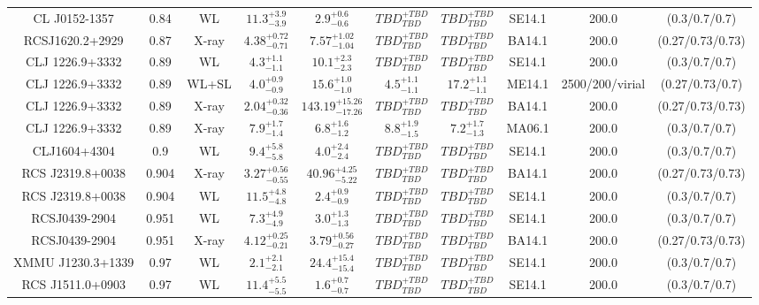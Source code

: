 \begin{table}
\begin{tabular}{cccccccccc}
CL J0152-1357 & 0.84 & WL & ${11.3}^{+3.9}_{-3.9}$ & ${2.9}^{+0.6}_{-0.6}$ & ${TBD}^{+TBD}_{TBD}$ & ${TBD}^{+TBD}_{TBD}$ & SE14.1 & 200.0 & (0.3/0.7/0.7) \\
RCSJ1620.2+2929 & 0.87 & X-ray & ${4.38}^{+0.72}_{-0.71}$ & ${7.57}^{+1.02}_{-1.04}$ & ${TBD}^{+TBD}_{TBD}$ & ${TBD}^{+TBD}_{TBD}$ & BA14.1 & 200.0 & (0.27/0.73/0.73) \\
CLJ 1226.9+3332 & 0.89 & WL & ${4.3}^{+1.1}_{-1.1}$ & ${10.1}^{+2.3}_{-2.3}$ & ${TBD}^{+TBD}_{TBD}$ & ${TBD}^{+TBD}_{TBD}$ & SE14.1 & 200.0 & (0.3/0.7/0.7) \\
CLJ 1226.9+3332 & 0.89 & WL+SL & ${4.0}^{+0.9}_{-0.9}$ & ${15.6}^{+1.0}_{-1.0}$ & ${4.5}^{+1.1}_{-1.1}$ & ${17.2}^{+1.1}_{-1.1}$ & ME14.1 & 2500/200/virial & (0.27/0.73/0.7) \\
CLJ 1226.9+3332 & 0.89 & X-ray & ${2.04}^{+0.32}_{-0.36}$ & ${143.19}^{+15.26}_{-17.26}$ & ${TBD}^{+TBD}_{TBD}$ & ${TBD}^{+TBD}_{TBD}$ & BA14.1 & 200.0 & (0.27/0.73/0.73) \\
CLJ 1226.9+3332 & 0.89 & X-ray & ${7.9}^{+1.7}_{-1.4}$ & ${6.8}^{+1.6}_{-1.2}$ & ${8.8}^{+1.9}_{-1.5}$ & ${7.2}^{+1.7}_{-1.3}$ & MA06.1 & 200.0 & (0.3/0.7/0.7) \\
CLJ1604+4304 & 0.9 & WL & ${9.4}^{+5.8}_{-5.8}$ & ${4.0}^{+2.4}_{-2.4}$ & ${TBD}^{+TBD}_{TBD}$ & ${TBD}^{+TBD}_{TBD}$ & SE14.1 & 200.0 & (0.3/0.7/0.7) \\
RCS J2319.8+0038 & 0.904 & X-ray & ${3.27}^{+0.56}_{-0.55}$ & ${40.96}^{+4.25}_{-5.22}$ & ${TBD}^{+TBD}_{TBD}$ & ${TBD}^{+TBD}_{TBD}$ & BA14.1 & 200.0 & (0.27/0.73/0.73) \\
RCS J2319.8+0038 & 0.904 & WL & ${11.5}^{+4.8}_{-4.8}$ & ${2.4}^{+0.9}_{-0.9}$ & ${TBD}^{+TBD}_{TBD}$ & ${TBD}^{+TBD}_{TBD}$ & SE14.1 & 200.0 & (0.3/0.7/0.7) \\
RCSJ0439-2904 & 0.951 & WL & ${7.3}^{+4.9}_{-4.9}$ & ${3.0}^{+1.3}_{-1.3}$ & ${TBD}^{+TBD}_{TBD}$ & ${TBD}^{+TBD}_{TBD}$ & SE14.1 & 200.0 & (0.3/0.7/0.7) \\
RCSJ0439-2904 & 0.951 & X-ray & ${4.12}^{+0.25}_{-0.21}$ & ${3.79}^{+0.56}_{-0.27}$ & ${TBD}^{+TBD}_{TBD}$ & ${TBD}^{+TBD}_{TBD}$ & BA14.1 & 200.0 & (0.27/0.73/0.73) \\
XMMU J1230.3+1339 & 0.97 & WL & ${2.1}^{+2.1}_{-2.1}$ & ${24.4}^{+15.4}_{-15.4}$ & ${TBD}^{+TBD}_{TBD}$ & ${TBD}^{+TBD}_{TBD}$ & SE14.1 & 200.0 & (0.3/0.7/0.7) \\
RCS J1511.0+0903 & 0.97 & WL & ${11.4}^{+5.5}_{-5.5}$ & ${1.6}^{+0.7}_{-0.7}$ & ${TBD}^{+TBD}_{TBD}$ & ${TBD}^{+TBD}_{TBD}$ & SE14.1 & 200.0 & (0.3/0.7/0.7) \\

\end{tabular}
\end{table}
